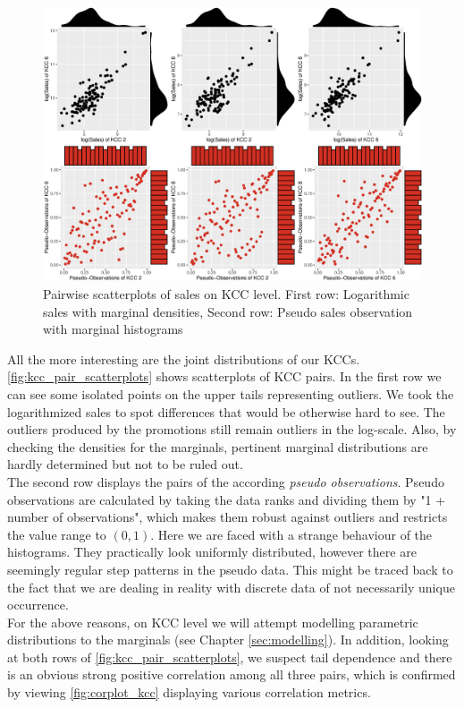 \begin{figure}[H]
\centering
  \includegraphics[width=0.95\linewidth]{figures/kcc_pair_scatterplots.eps}
  \caption{Pairwise scatterplots of sales on \ac{KCC} level. First row: Logarithmic sales with marginal densities, Second row: Pseudo sales observation with marginal histograms}
  \label{fig:kcc_pair_scatterplots}
\end{figure}


All the more interesting are the joint distributions of our \acp{KCC}. \autoref{fig:kcc_pair_scatterplots} shows scatterplots of \ac{KCC} pairs. In the first row we can see some isolated points on the upper tails representing outliers. We took the logarithmized sales to spot differences that would be otherwise hard to see. The outliers produced by the promotions still remain outliers in the log-scale. Also, by checking the densities for the marginals, pertinent marginal distributions are hardly determined but not to be ruled out.\\
The second row displays the pairs of the according \textit{pseudo observations}. Pseudo observations are calculated by taking the data ranks and dividing them by "1 + number of observations", which makes them robust against outliers and restricts the value range to $(0, 1)$. Here we are faced with a strange behaviour of the histograms. They practically look uniformly distributed, however there are seemingly regular step patterns in the pseudo data. This might be traced back to the fact that we are dealing in reality with discrete data of not necessarily unique occurrence.\\

For the above reasons, on \ac{KCC} level we will attempt modelling parametric distributions to the marginals (see Chapter \ref{sec:modelling}). 
In addition, looking at both rows of \autoref{fig:kcc_pair_scatterplots}, we suspect tail dependence and there is an obvious strong positive correlation among all three pairs, which is confirmed by viewing \autoref{fig:corplot_kcc} displaying various correlation metrics.
 \\


